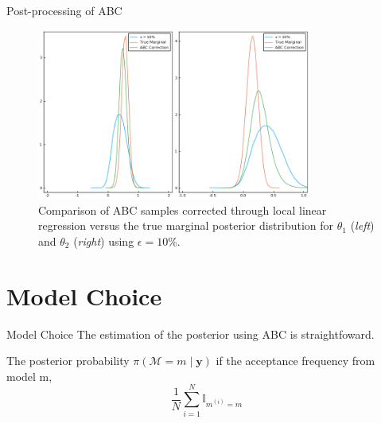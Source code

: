 \documentclass[10pt]{beamer}
\begin{document}
\begin{frame}[fragile]{Post-processing of ABC}

    \begin{figure}[H]
        \centering
        \includegraphics[width=9cm]{images/ABCRegression_Marginal.png}
        \caption{Comparison of ABC samples corrected through
        local linear regression versus the true marginal posterior
        distribution for $\theta_1$ (\textit{left}) and
        $\theta_2$ (\textit{right}) using $\epsilon = 10\%$.
        }
    \end{figure}

\end{frame}



\AtBeginSection{}
\section[Model Choice]{Model Choice}
\begin{frame}[fragile]{Model Choice}
  The estimation of the posterior using ABC is straightfoward.

  \begin{algorithm}[H]
  \SetAlgoLined
   \caption{ABC Model Choice}
  \end{algorithm}

  The posterior probability $\pi(\mathcal{M}=m \mid \bm y)$
  if the acceptance frequency from model m,
  $$
  \frac{1}{N}\sum^N_{i=1}\mathbb I_{m^{(i)}=m}
  $$


\end{frame}
\end{document}
